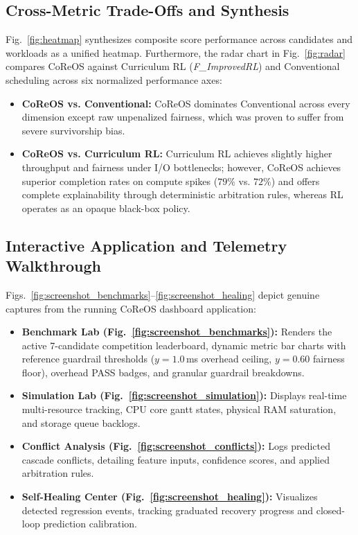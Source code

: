 \documentclass[conference]{IEEEtran}
\begin{document}
\subsection{Cross-Metric Trade-Offs and Synthesis}
Fig.~\ref{fig:heatmap} synthesizes composite score performance across candidates and workloads as a unified heatmap. Furthermore, the radar chart in Fig.~\ref{fig:radar} compares CoReOS against Curriculum RL (\textit{F\_ImprovedRL}) and Conventional scheduling across six normalized performance axes:
\begin{itemize}
    \item \textbf{CoReOS vs. Conventional:} CoReOS dominates Conventional across every dimension except raw unpenalized fairness, which was proven to suffer from severe survivorship bias.
    \item \textbf{CoReOS vs. Curriculum RL:} Curriculum RL achieves slightly higher throughput and fairness under I/O bottlenecks; however, CoReOS achieves superior completion rates on compute spikes ($79\%$ vs. $72\%$) and offers complete explainability through deterministic arbitration rules, whereas RL operates as an opaque black-box policy.
\end{itemize}

\subsection{Interactive Application and Telemetry Walkthrough}
Figs.~\ref{fig:screenshot_benchmarks}--\ref{fig:screenshot_healing} depict genuine captures from the running CoReOS dashboard application:
\begin{itemize}
    \item \textbf{Benchmark Lab (Fig.~\ref{fig:screenshot_benchmarks}):} Renders the active 7-candidate competition leaderboard, dynamic metric bar charts with reference guardrail thresholds ($y=1.0$\,ms overhead ceiling, $y=0.60$ fairness floor), overhead PASS badges, and granular guardrail breakdowns.
    \item \textbf{Simulation Lab (Fig.~\ref{fig:screenshot_simulation}):} Displays real-time multi-resource tracking, CPU core gantt states, physical RAM saturation, and storage queue backlogs.
    \item \textbf{Conflict Analysis (Fig.~\ref{fig:screenshot_conflicts}):} Logs predicted cascade conflicts, detailing feature inputs, confidence scores, and applied arbitration rules.
    \item \textbf{Self-Healing Center (Fig.~\ref{fig:screenshot_healing}):} Visualizes detected regression events, tracking graduated recovery progress and closed-loop prediction calibration.
\end{itemize}
\end{document}
